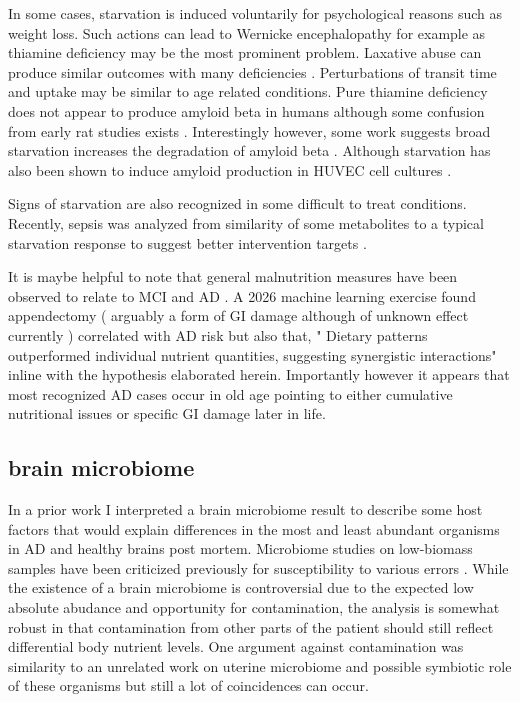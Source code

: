 In some cases, starvation is induced voluntarily for psychological
reasons such as weight loss. Such actions can lead to 
Wernicke encephalopathy 
\cite{PMC12700180}
for example as thiamine deficiency may be the most prominent problem.
Laxative abuse can produce similar outcomes with many deficiencies
\cite{Stryelkina_Constans_Alger_From_Starvation_Neurological_2025}.
Perturbations of transit time and uptake may be similar to 
age related conditions.  
Pure thiamine deficiency does not appear to produce amyloid beta
in humans although some confusion from early rat studies
exists
\cite{Calingasan_Gandy_Baker_Novel_neuritic_clusters_with_1996}.
Interestingly however, some work suggests broad starvation increases
the degradation of amyloid beta \cite{HEIN20171554}.
Although starvation has also been shown to induce amyloid production
in HUVEC cell cultures
\cite{Ma_Wang_Li_Starvation_triggers_Aupbeta42_generation_2010}.

Signs of starvation are also recognized in some difficult to
treat conditions. Recently, sepsis was analyzed from similarity
of some metabolites to a typical starvation response
to suggest better intervention targets
\cite{Vandewalle_Libert_Sepsis_failing_starvation_2022}.


It is maybe helpful to note that general malnutrition measures
have been observed to relate to MCI and AD 
\cite{Kimura_Sugimoto_Kitamori_Malnutrition_Associated_with_2019}
.
A 2026 machine learning exercise found appendectomy ( arguably
a form of GI damage although of unknown effect currently )
correlated with AD risk but also that, "
Dietary patterns outperformed individual nutrient quantities, suggesting synergistic interactions"
\cite{Jabeen_Karimi_Zomorrodi_Multimodal_machine_learning_2026}
inline with the hypothesis elaborated herein.
Importantly however it appears that most recognized AD
cases occur in old age pointing to either cumulative
nutritional issues or specific GI damage later in life.


\subsection{brain microbiome }

In a prior work \cite{marchywka-MJM-2023-008-0.30rg}
I interpreted a brain microbiome result to describe some
host factors that would explain differences in the most and
least abundant organisms in AD and healthy brains post mortem.
Microbiome studies on low-biomass samples have been criticized
previously for susceptibility to various errors
\cite{Kennedy_deGoffau_PerezMunoz_Questioning_fetal_microbiome_2023}.
While the existence of a brain microbiome is controversial
due to the expected low absolute abudance and opportunity
for contamination, the analysis is somewhat robust in that
contamination from other parts of the patient should
still reflect differential body nutrient levels. 
One argument against contamination was similarity
to an unrelated work on uterine microbiome and possible symbiotic
role of these organisms but still a lot of coincidences can occur.

